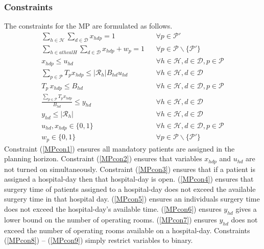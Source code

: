 \subsubsection*{Constraints} The constraints for the MP are formulated as follows.
\begin{align}
    \sum\limits_{h \in \mathcal{H}} \sum\limits_{d \in \mathcal{D}}x_{hdp} = 1 
        && \forall p \in \mathcal{P}' \label{MPcon1}\\
    \sum\limits_{h \in athcal{H}} \sum\limits_{d \in \mathcal{D}} x_{hdp} + w_p = 1
        && \forall p \in \mathcal{P} \backslash \{\mathcal{P}'\}\label{MPcon2}\\
    x_{hdp} \leq u_{hd}
        && \forall h \in \mathcal{H}, d \in \mathcal{D}, p \in \mathcal{P}\label{MPcon3}\\
    \sum\limits_{p \in \mathcal{P}}T_px_{hdp} \leq |\mathcal{R}_h|B_{hd}u_{hd}
        && \forall h \in \mathcal{H}, d \in \mathcal{D} \label{MPcon4}\\
    T_p\,x_{hdp} \leq B_{hd} 
        && \forall h \in \mathcal{H}, d \in \mathcal{D}, p \in \mathcal{P}\label{MPcon5}\\
     \frac{\sum_{p \in \mathcal{P}}T_px_{hdp}}{B_{hd}} \leq y_{hd}
        && \forall h \in \mathcal{H}, d\in \mathcal{D} \label{MPcon6}\\
        y_{hd} \leq |\mathcal{R}_h|
        && \forall h\in\mathcal{H}, d \in \mathcal{D} \label{MPcon7}\\
        u_{hd}, x_{hdp} \in \{ 0,1\}
        && \forall h\in \mathcal{H}, d \in \mathcal{D}, p \in \mathcal{P}\label{MPcon8}\\
        w_p \in \{0,1\}
        && \forall p \in \mathcal{P} \backslash\{\mathcal{P}'\}\label{MPcon9}
\end{align}
Constraint (\ref{MPcon1}) ensures all mandatory patients are assigned in the planning 
horizon. Constraint (\ref{MPcon2}) ensures that variables $x_{hdp}$ and $u_{hd}$ are not
turned on simultaneously. Constraint (\ref{MPcon3}) ensures that if a patient is assigned
a hospital-day then that hospital-day is open. (\ref*{MPcon4}) ensures that surgery time 
of patients assigned to a hospital-day does not exceed the available surgery time in
that hospital day. (\ref*{MPcon5}) ensures an individuals surgery time does not exceed 
the hospital-day's available time. (\ref*{MPcon6}) ensures $y_{hd}$ gives a lower bound 
on the number of operating rooms. (\ref*{MPcon7}) ensures $y_{hd}$ does not exceed the
number of operating rooms available on a hospital-day. Constraints (\ref*{MPcon8}) -- (\ref*{MPcon9}) simply restrict
variables to binary.

